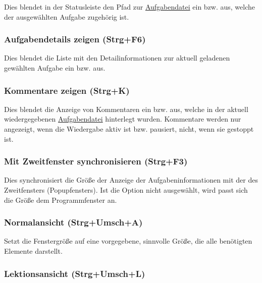 \documentclass[a4paper,DIV=11
]{scrartcl}
\begin{document}
Dies blendet in der Statusleiste den Pfad zur
\protect\hyperlink{aufgabendateien}{Aufgabendatei} ein bzw. aus, welche
der ausgewählten Aufgabe zugehörig ist.

\hypertarget{aufgabendetails-zeigen-strgf6}{%
\subsubsection{Aufgabendetails zeigen
(Strg+F6)}\label{aufgabendetails-zeigen-strgf6}}

Dies blendet die Liste mit den Detailinformationen zur aktuell geladenen
gewählten Aufgabe ein bzw. aus.

\hypertarget{kommentare-zeigen-strgk}{%
\subsubsection{Kommentare zeigen
(Strg+K)}\label{kommentare-zeigen-strgk}}

Dies blendet die Anzeige von Kommentaren ein bzw. aus, welche in der
aktuell wiedergegebenen
\protect\hyperlink{aufgabendateien}{Aufgabendatei} hinterlegt wurden.
Kommentare werden nur angezeigt, wenn die Wiedergabe aktiv ist bzw.
pausiert, nicht, wenn sie gestoppt ist.

\hypertarget{mit-zweitfenster-synchronisieren-strgf3}{%
\subsubsection{Mit Zweitfenster synchronisieren
(Strg+F3)}\label{mit-zweitfenster-synchronisieren-strgf3}}

Dies synchronisiert die Größe der Anzeige der Aufgabeninformationen mit
der des Zweitfensters (Popupfensters). Ist die Option nicht ausgewählt,
wird passt sich die Größe dem Programmfenster an.

\hypertarget{normalansicht-strgumscha}{%
\subsubsection{Normalansicht
(Strg+Umsch+A)}\label{normalansicht-strgumscha}}

Setzt die Fenstergröße auf eine vorgegebene, sinnvolle Größe, die alle
benötigten Elemente darstellt.

\hypertarget{lektionsansicht-strgumschl}{%
\subsubsection{Lektionsansicht
(Strg+Umsch+L)}\label{lektionsansicht-strgumschl}}
\end{document}

